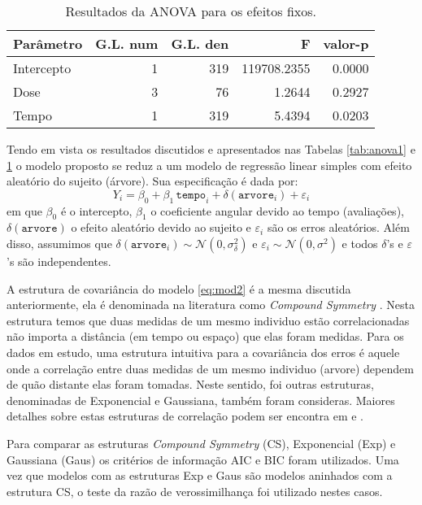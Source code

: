 \documentclass[12pt,a4paper,final]{article}
\begin{document}
\begin{table}[H]
\centering
\caption{Resultados da ANOVA para os efeitos fixos.}
\onehalfspacing
\label{tab:anova2}
\begin{tabular}{lrrrr}\toprule
	Parâmetro& G.L. num  & G.L. den & F & valor-p \\ \midrule
		Intercepto &     1 & 319  & 119708.2355 & 0.0000 \\ 
		Dose &     3 & 76  & 1.2644 & 0.2927 \\ 
		Tempo &     1 & 319  & 5.4394 & 0.0203 \\ \bottomrule
\end{tabular}
\end{table}

Tendo em vista os resultados discutidos e apresentados nas Tabelas \ref{tab:anova1} e \ref{tab:anova2} o modelo proposto
se reduz a um modelo de regressão linear simples com efeito aleatório do sujeito (árvore). Sua especificação é dada por:
\begin{equation}\label{eq:mod2}
Y_i = \beta_0 + \beta_1\,\texttt{tempo}_i + \delta(\texttt{arvore}_i) + \varepsilon_i
\end{equation}
em que $\beta_0$ é o intercepto, $ \beta_1 $ o coeficiente angular devido ao tempo (avaliações), $\delta(\texttt{arvore})$
o efeito aleatório devido ao sujeito e $\varepsilon_i$ são os erros aleatórios. Além disso, assumimos que
$\delta(\texttt{arvore}_i) \sim \mathcal{N}(0, \sigma^2_\delta)$ e $\varepsilon_i \sim \mathcal{N}(0, \sigma^2)$ e todos $\delta$'s e $\varepsilon$'s são independentes. 

A estrutura de covariância do modelo \eqref{eq:mod2} é a mesma discutida anteriormente, ela é denominada 
na literatura como \emph{Compound Symmetry} \cite{Verbeke1997}. Nesta estrutura 
temos que duas medidas de um mesmo individuo estão correlacionadas não importa a distância 
(em tempo ou espaço) que elas foram medidas. Para os dados em estudo, uma estrutura intuitiva para a 
covariância dos erros é aquele onde
a correlação entre duas medidas de um mesmo individuo (arvore) dependem de quão distante elas foram tomadas. 
Neste sentido, foi outras estruturas, denominadas de Exponencial e Gaussiana, também foram consideras. 
Maiores detalhes sobre estas estruturas de correlação podem ser encontra em  e 
.

Para comparar as estruturas \emph{Compound Symmetry} (CS), Exponencial (Exp) e Gaussiana (Gaus) os critérios de informação
AIC e BIC foram utilizados. Uma vez que modelos com as estruturas Exp e Gaus são modelos aninhados com a estrutura CS,
o teste da razão de verossimilhança foi utilizado nestes casos. 
\end{document}
